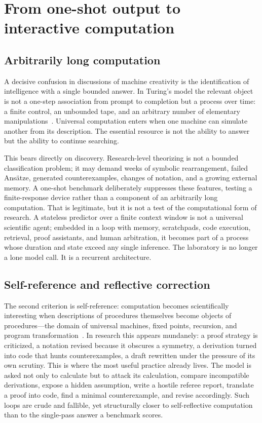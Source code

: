 \documentclass[
  aps,
  reprint,
  superscriptaddress,
  floatfix,
  nofootinbib,
  longbibliography
]{revtex4-2}
\begin{document}
\section{From one-shot output to interactive computation}
\label{sec:turing}

\subsection{Arbitrarily long computation}

A decisive confusion in discussions of machine creativity is the identification
of intelligence with a single bounded answer. In Turing's model the relevant
object is not a one-step association from prompt to completion but a process over
time: a finite control, an unbounded tape, and an arbitrary number of elementary
manipulations~\cite{turing-36}. Universal computation enters when one machine can
simulate another from its description. The essential resource is not the ability
to answer but the ability to continue searching.

This bears directly on discovery. Research-level theorizing is not a bounded
classification problem; it may demand weeks of symbolic rearrangement, failed
Ans\"atze, generated counterexamples, changes of notation, and a growing external
memory. A one-shot benchmark deliberately suppresses these features, testing a
finite-response device rather than a component of an arbitrarily long
computation. That is legitimate, but it is not a test of the computational form
of research. A stateless predictor over a finite context window is not a
universal scientific agent; embedded in a loop with memory, scratchpads, code
execution, retrieval, proof assistants, and human arbitration, it becomes part of
a process whose duration and state exceed any single inference. The laboratory is
no longer a lone model call. It is a recurrent architecture.

\subsection{Self-reference and reflective correction}

The second criterion is self-reference: computation becomes scientifically
interesting when descriptions of procedures themselves become objects of
procedures---the domain of universal machines, fixed points, recursion, and
program transformation~\cite{kleene-52,rogers1,Smullyan1993-SMURTF,Yanofsky-BSL:9051621}. In research this appears
mundanely: a proof strategy is criticized, a notation revised because it obscures
a symmetry, a derivation turned into code that hunts counterexamples, a draft
rewritten under the pressure of its own scrutiny. This is where the most useful
practice already lives. The model is asked not only to calculate but to attack
its calculation, compare incompatible derivations, expose a hidden assumption,
write a hostile referee report, translate a proof into code, find a minimal
counterexample, and revise accordingly. Such loops are crude and fallible, yet
structurally closer to self-reflective computation than to the single-pass answer
a benchmark scores.
\end{document}
